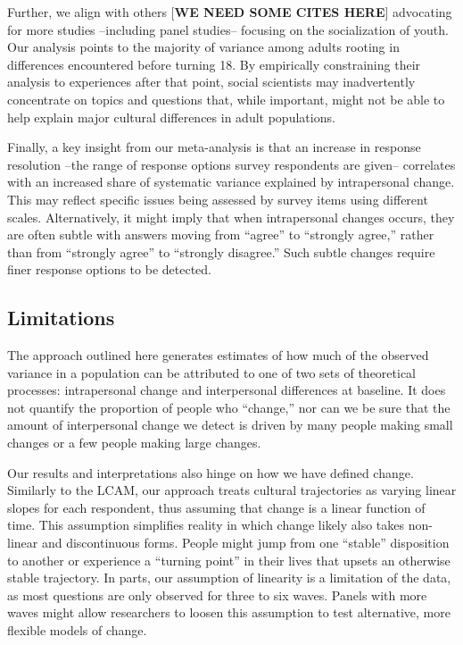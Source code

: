 \documentclass[
  12pt,
]{article}
\begin{document}
Further, we align with others {[}\textbf{WE NEED SOME CITES HERE}{]}
advocating for more studies --including panel studies-- focusing on the
socialization of youth. Our analysis points to the majority of variance
among adults rooting in differences encountered before turning 18. By
empirically constraining their analysis to experiences after that point,
social scientists may inadvertently concentrate on topics and questions
that, while important, might not be able to help explain major cultural
differences in adult populations.

Finally, a key insight from our meta-analysis is that an increase in
response resolution --the range of response options survey respondents
are given-- correlates with an increased share of systematic variance
explained by intrapersonal change. This may reflect specific issues
being assessed by survey items using different scales. Alternatively, it
might imply that when intrapersonal changes occurs, they are often
subtle with answers moving from ``agree'' to ``strongly agree,'' rather
than from ``strongly agree'' to ``strongly disagree.'' Such subtle
changes require finer response options to be detected.

\hypertarget{limitations}{%
\subsection{Limitations}\label{limitations}}

The approach outlined here generates estimates of how much of the
observed variance in a population can be attributed to one of two sets
of theoretical processes: intrapersonal change and interpersonal
differences at baseline. It does not quantify the proportion of people
who ``change,'' nor can we be sure that the amount of interpersonal
change we detect is driven by many people making small changes or a few
people making large changes.

Our results and interpretations also hinge on how we have defined
change. Similarly to the LCAM, our approach treats cultural trajectories
as varying linear slopes for each respondent, thus assuming that change
is a linear function of time. This assumption simplifies reality in
which change likely also takes non-linear and discontinuous forms.
People might jump from one ``stable'' disposition to another or
experience a ``turning point'' in their lives that upsets an otherwise
stable trajectory. In parts, our assumption of linearity is a limitation
of the data, as most questions are only observed for three to six waves.
Panels with more waves might allow researchers to loosen this assumption
to test alternative, more flexible models of change.
\end{document}
